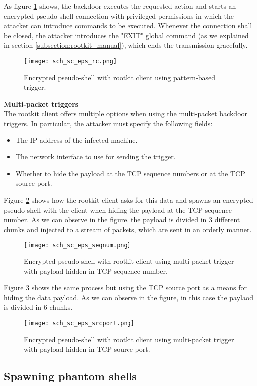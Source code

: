 As figure \ref{fig:sc_eps_rc} shows, the backdoor executes the requested action and starts an encrypted pseudo-shell connection with privileged permissions in which the attacker can introduce commands to be executed. Whenever the connection shall be closed, the attacker introduces the "EXIT" global command (as we explained in section \ref{subsection:rootkit_manual}), which ends the transmission gracefully.

\begin{figure}[htbp]
	\centering
	\texttt{[image: sch\_sc\_eps\_rc.png]}
	\caption{Encrypted pseudo-shell with rootkit client using pattern-based trigger.}
	\label{fig:sc_eps_rc}
\end{figure}

\textbf{Multi-packet triggers}\\
The rootkit client offers multiple options when using the multi-packet backdoor triggers. In particular, the attacker must specify the following fields:
\begin{itemize}
\item The IP address of the infected machine.
\item The network interface to use for sending the trigger.
\item Whether to hide the payload at the TCP sequence numbers or at the TCP source port.
\end{itemize}

Figure \ref{fig:sc_eps_seqnum} shows how the rootkit client asks for this data and spawns an encrypted pseudo-shell with the client when hiding the payload at the TCP sequence number. As we can observe in the figure, the payload is divided in 3 different chunks and injected to a stream of packets, which are sent in an orderly manner.

\begin{figure}[htbp]
	\centering
	\texttt{[image: sch\_sc\_eps\_seqnum.png]}
	\caption{Encrypted pseudo-shell with rootkit client using multi-packet trigger with payload hidden in TCP sequence number.}
	\label{fig:sc_eps_seqnum}
\end{figure}

Figure \ref{fig:sc_eps_srcport} shows the same process but using the TCP source port as a means for hiding the data payload. As we can observe in the figure, in this case the paylaod is divided in 6 chunks.

\begin{figure}[htbp]
	\centering
	\texttt{[image: sch\_sc\_eps\_srcport.png]}
	\caption{Encrypted pseudo-shell with rootkit client using multi-packet trigger with payload hidden in TCP source port.}
	\label{fig:sc_eps_srcport}
\end{figure}

\subsection{Spawning phantom shells}





